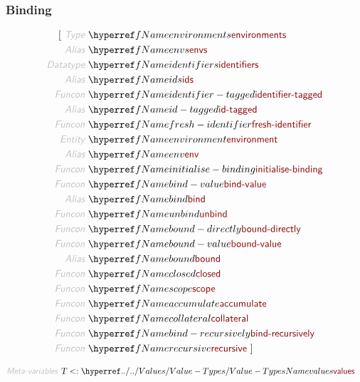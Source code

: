 \subsubsection*{Binding}\hypertarget{binding}{}\label{binding}

\begin{displaymath}
\relax\begin{aligned}\relax
  [ ~ 
  \KEY{Type} ~ & \NAMEREF{environments} \\
  \KEY{Alias} ~ & \NAMEREF{envs} \\
  \KEY{Datatype} ~ & \NAMEREF{identifiers} \\
  \KEY{Alias} ~ & \NAMEREF{ids} \\
  \KEY{Funcon} ~ & \NAMEREF{identifier-tagged} \\
  \KEY{Alias} ~ & \NAMEREF{id-tagged} \\
  \KEY{Funcon} ~ & \NAMEREF{fresh-identifier} \\
  \KEY{Entity} ~ & \NAMEREF{environment} \\
  \KEY{Alias} ~ & \NAMEREF{env} \\
  \KEY{Funcon} ~ & \NAMEREF{initialise-binding} \\
  \KEY{Funcon} ~ & \NAMEREF{bind-value} \\
  \KEY{Alias} ~ & \NAMEREF{bind} \\
  \KEY{Funcon} ~ & \NAMEREF{unbind} \\
  \KEY{Funcon} ~ & \NAMEREF{bound-directly} \\
  \KEY{Funcon} ~ & \NAMEREF{bound-value} \\
  \KEY{Alias} ~ & \NAMEREF{bound} \\
  \KEY{Funcon} ~ & \NAMEREF{closed} \\
  \KEY{Funcon} ~ & \NAMEREF{scope} \\
  \KEY{Funcon} ~ & \NAMEREF{accumulate} \\
  \KEY{Funcon} ~ & \NAMEREF{collateral} \\
  \KEY{Funcon} ~ & \NAMEREF{bind-recursively} \\
  \KEY{Funcon} ~ & \NAMEREF{recursive}
  ~ ]
\end{aligned}
\end{displaymath}

\begin{displaymath}
\relax\begin{aligned}\relax
  \KEY{Meta-variables} ~ 
  & \VAR{T} <: \NAMEHYPER{../../Values}{Value-Types}{values}
\end{aligned}
\end{displaymath}

